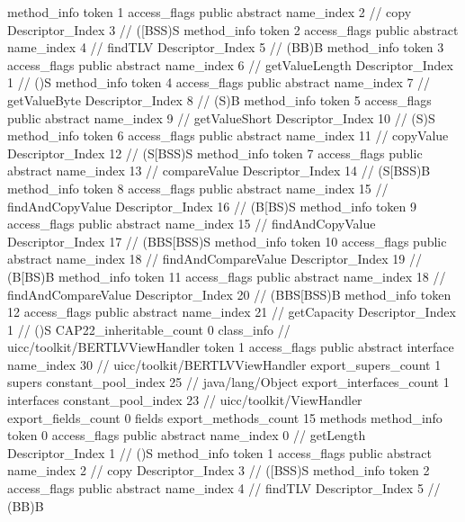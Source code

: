 {{{{{				}
				method_info {
					token	1
					access_flags	public abstract
					name_index	2		// copy
					Descriptor_Index	3		// ([BSS)S
				}
				method_info {
					token	2
					access_flags	public abstract
					name_index	4		// findTLV
					Descriptor_Index	5		// (BB)B
				}
				method_info {
					token	3
					access_flags	public abstract
					name_index	6		// getValueLength
					Descriptor_Index	1		// ()S
				}
				method_info {
					token	4
					access_flags	public abstract
					name_index	7		// getValueByte
					Descriptor_Index	8		// (S)B
				}
				method_info {
					token	5
					access_flags	public abstract
					name_index	9		// getValueShort
					Descriptor_Index	10		// (S)S
				}
				method_info {
					token	6
					access_flags	public abstract
					name_index	11		// copyValue
					Descriptor_Index	12		// (S[BSS)S
				}
				method_info {
					token	7
					access_flags	public abstract
					name_index	13		// compareValue
					Descriptor_Index	14		// (S[BSS)B
				}
				method_info {
					token	8
					access_flags	public abstract
					name_index	15		// findAndCopyValue
					Descriptor_Index	16		// (B[BS)S
				}
				method_info {
					token	9
					access_flags	public abstract
					name_index	15		// findAndCopyValue
					Descriptor_Index	17		// (BBS[BSS)S
				}
				method_info {
					token	10
					access_flags	public abstract
					name_index	18		// findAndCompareValue
					Descriptor_Index	19		// (B[BS)B
				}
				method_info {
					token	11
					access_flags	public abstract
					name_index	18		// findAndCompareValue
					Descriptor_Index	20		// (BBS[BSS)B
				}
				method_info {
					token	12
					access_flags	public abstract
					name_index	21		// getCapacity
					Descriptor_Index	1		// ()S
				}
			}
			CAP22_inheritable_count	0
		}
		class_info {		// uicc/toolkit/BERTLVViewHandler
			token	1
			access_flags	public abstract interface
			name_index	30		// uicc/toolkit/BERTLVViewHandler
			export_supers_count	1
			supers {
				constant_pool_index	25		// java/lang/Object
			}
			export_interfaces_count	1
			interfaces {
				constant_pool_index	23		// uicc/toolkit/ViewHandler
			}
			export_fields_count	0
			fields {
			}
			export_methods_count	15
			methods {
				method_info {
					token	0
					access_flags	public abstract
					name_index	0		// getLength
					Descriptor_Index	1		// ()S
				}
				method_info {
					token	1
					access_flags	public abstract
					name_index	2		// copy
					Descriptor_Index	3		// ([BSS)S
				}
				method_info {
					token	2
					access_flags	public abstract
					name_index	4		// findTLV
					Descriptor_Index	5		// (BB)B
				}
}}}}
